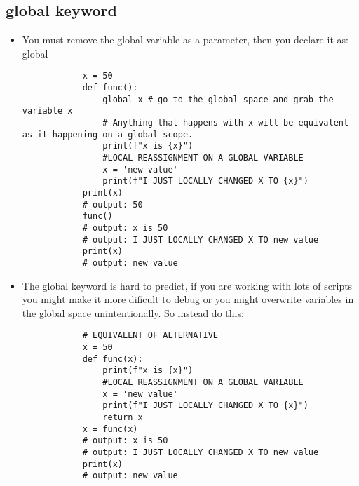 \subsection{global keyword}
\begin{itemize}
    \item You must remove the global variable as a parameter, then you declare it as: global   
        \begin{verbatim}
            x = 50 
            def func():
                global x # go to the global space and grab the variable x
                # Anything that happens with x will be equivalent as it happening on a global scope.
                print(f"x is {x}")
                #LOCAL REASSIGNMENT ON A GLOBAL VARIABLE
                x = 'new value'
                print(f"I JUST LOCALLY CHANGED X TO {x}")
            print(x)
            # output: 50
            func() 
            # output: x is 50
            # output: I JUST LOCALLY CHANGED X TO new value
            print(x)
            # output: new value
        \end{verbatim}

    \item The global keyword is hard to predict, if you are working with lots of scripts you might make it more dificult to debug or you might overwrite variables in the global space unintentionally. So instead do this: 
        \begin{verbatim}
            # EQUIVALENT OF ALTERNATIVE
            x = 50 
            def func(x):
                print(f"x is {x}")
                #LOCAL REASSIGNMENT ON A GLOBAL VARIABLE
                x = 'new value'
                print(f"I JUST LOCALLY CHANGED X TO {x}")
                return x
            x = func(x)
            # output: x is 50 
            # output: I JUST LOCALLY CHANGED X TO new value
            print(x)
            # output: new value
        \end{verbatim}
\end{itemize}
